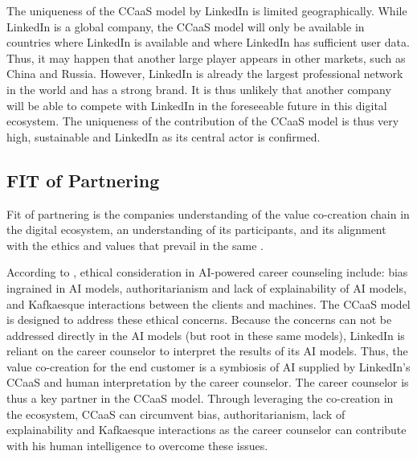 The uniqueness of the CCaaS model by LinkedIn is limited geographically. While LinkedIn is a global
company, the CCaaS model will only be available in countries where LinkedIn is available and where 
LinkedIn has sufficient user data. Thus, it may happen that another large player appears in other 
markets, such as China and Russia. However, LinkedIn is already the largest professional network in
the world and has a strong brand. It is thus unlikely that another company will be able to compete
with LinkedIn in the foreseeable future in this digital ecosystem. The uniqueness of the contribution 
of the CCaaS model is thus very high, sustainable and LinkedIn as its central actor is confirmed.

\subsection{FIT of Partnering}

Fit of partnering is the companies understanding of the value co-creation chain in the digital
ecosystem, an understanding of its participants, and its alignment with the ethics and values that prevail
in the same \citep[p.~53]{griederDigitalEcosystemHow2019}.

According to \citet{kaserAIpoweredCareerCounseling2023}, ethical consideration in AI-powered career counseling 
include: bias ingrained in AI models, authoritarianism and lack of explainability of AI models, and 
Kafkaesque interactions between the clients and machines. The CCaaS model is designed to address these ethical
concerns. Because the concerns can not be addressed directly in the AI models (but root in these same models),
LinkedIn is reliant on the career counselor to interpret the results of its AI models. Thus, the value
co-creation for the end customer is a symbiosis of AI supplied by LinkedIn's CCaaS and human interpretation by
the career counselor. The career counselor is thus a key partner in the CCaaS model.
Through leveraging the co-creation in the ecosystem, CCaaS can circumvent bias, authoritarianism, 
lack of explainability and Kafkaesque interactions as the career counselor can contribute with his 
human intelligence to overcome these issues.


